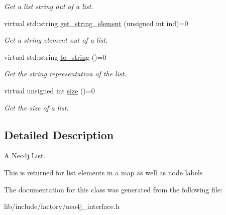 \begin{DoxyCompactItemize}
\begin{DoxyCompactList}\small\item\em Get a list string out of a list. \end{DoxyCompactList}\item 
\hypertarget{classDbListInterface_a5b56c68ef216efd371e17d65ad6adee1}{virtual std\-::string \hyperlink{classDbListInterface_a5b56c68ef216efd371e17d65ad6adee1}{get\-\_\-string\-\_\-element} (unsigned int ind)=0}\label{classDbListInterface_a5b56c68ef216efd371e17d65ad6adee1}

\begin{DoxyCompactList}\small\item\em Get a string element out of a list. \end{DoxyCompactList}\item 
\hypertarget{classDbListInterface_a18c8fd940cf2225ef9417e2b54ed0fe2}{virtual std\-::string \hyperlink{classDbListInterface_a18c8fd940cf2225ef9417e2b54ed0fe2}{to\-\_\-string} ()=0}\label{classDbListInterface_a18c8fd940cf2225ef9417e2b54ed0fe2}

\begin{DoxyCompactList}\small\item\em Get the string representation of the list. \end{DoxyCompactList}\item 
\hypertarget{classDbListInterface_a5e811b296b3bf7cea5149fce6d69138d}{virtual unsigned int \hyperlink{classDbListInterface_a5e811b296b3bf7cea5149fce6d69138d}{size} ()=0}\label{classDbListInterface_a5e811b296b3bf7cea5149fce6d69138d}

\begin{DoxyCompactList}\small\item\em Get the size of a list. \end{DoxyCompactList}\end{DoxyCompactItemize}


\subsection{Detailed Description}
A Neo4j List. 

This is returned for list elements in a map as well as node labels 

The documentation for this class was generated from the following file\-:\begin{DoxyCompactItemize}
\item 
lib/include/factory/neo4j\-\_\-interface.\-h\end{DoxyCompactItemize}
